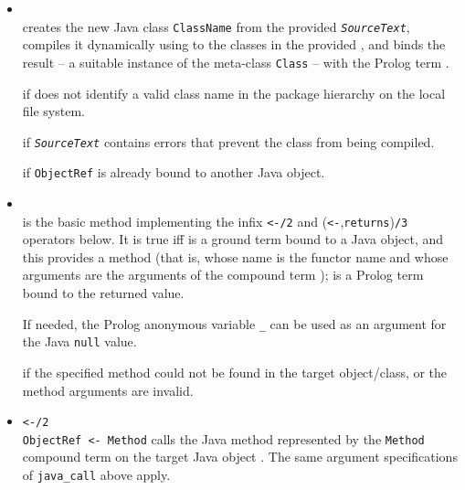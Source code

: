 \begin{itemize}

\item {}\\
    \noindent{}
    creates the new Java class \texttt{ClassName} from the provided \texttt{\textit{SourceText}}, compiles it dynamically using to the classes in the provided , and binds the result -- a suitable instance of the meta-class \texttt{Class} -- with the Prolog term .


     if  does not identify a valid class name in the package hierarchy on the local file system.

     if \texttt{\textit{SourceText}} contains errors that prevent the class from being compiled.

     if \texttt{ObjectRef} is already bound to another Java object.


\item {}\\
    \noindent{} is the basic method implementing the infix \verb|<-/2| and (\verb|<-|,\texttt{returns})\texttt{/3} operators below. It is true iff  is a ground term bound to a Java object, and this provides a method  (that is, whose name is the functor name and whose arguments are the arguments of the compound term );  is a Prolog term bound to the returned value.

    If needed, the Prolog anonymous variable \texttt{\_} can be used as an argument for the Java \texttt{null} value.


     if the specified method could not be found in the target object/class, or the method arguments are invalid.

\item \verb|<-/2|\\
    \noindent\verb|ObjectRef <- Method| calls the Java method represented by the \texttt{Method} compound term on the target Java object . The same argument specifications of \texttt{java\_call} above apply.


\end{itemize}
